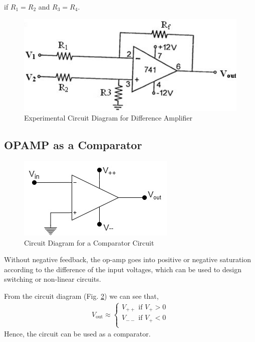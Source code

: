 if $R_1 = R_2$ and $ R_3 = R_4$.

\begin{figure}[H]
    \centering
    \includegraphics[width=0.8\columnwidth]{images/diff2.png}
    \caption{Experimental Circuit Diagram for Difference Amplifier}
    \label{diff2}
\end{figure}
\subsection{OPAMP as a Comparator}

\begin{figure}[H]
    \centering
    \includegraphics[width=0.8\columnwidth]{images/comparator.jpg}
    \caption{Circuit Diagram for a Comparator Circuit}
    \label{comp1}
\end{figure}

Without negative feedback, the op-amp goes into positive or negative saturation according to the difference of the input voltages, which can be used to design switching or non-linear circuits.

From the circuit diagram (Fig. \ref{comp1}) we can see that, 
\begin{align}
    V_\text{out} \approx \begin{cases}
        V_{++} \text{ if } V_+ > 0\\
        V_{--} \text{ if } V_+ < 0\\
    \end{cases}
\end{align}
Hence, the circuit can be used as a comparator.

